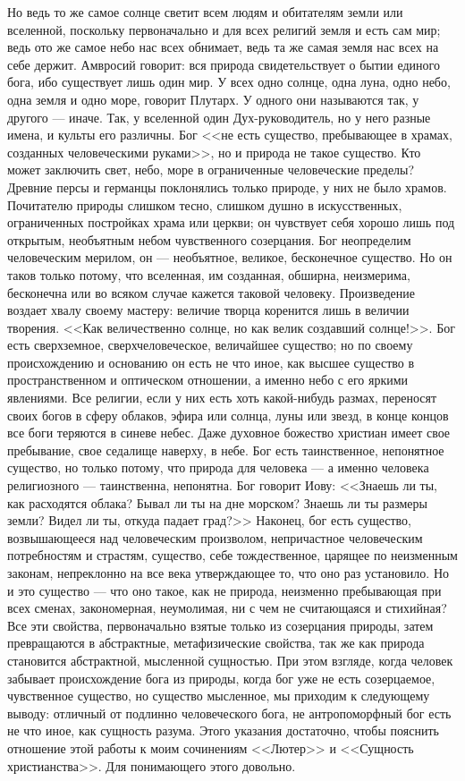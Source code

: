 \documentclass[12pt]{article}
\begin{document}
Но ведь то же самое солнце светит всем людям и обитателям земли или вселенной, поскольку первоначально и для всех религий земля и есть сам мир; ведь ото же самое небо нас всех обнимает, ведь та же самая земля нас всех на себе держит. Амвросий говорит: вся природа свидетельствует о бытии единого бога, ибо существует лишь один мир. У всех одно солнце, одна луна, одно небо, одна земля и одно море, говорит Плутарх. У одного они называются так, у другого --- иначе. Так, у вселенной один Дух-руководитель, но у него разные имена, и культы его различны. Бог <<не есть существо, пребывающее в храмах, созданных человеческими руками>>, но и природа не такое существо. Кто может заключить свет, небо, море в ограниченные человеческие пределы? Древние персы и германцы поклонялись только природе, у них не было храмов. Почитателю природы слишком тесно, слишком душно в искусственных, ограниченных постройках храма или церкви; он чувствует себя хорошо лишь под открытым, необъятным небом чувственного созерцания. Бог неопределим человеческим мерилом, он --- необъятное, великое, бесконечное существо. Но он таков только потому, что вселенная, им созданная, обширна, неизмерима, бесконечна или во всяком случае кажется таковой человеку. Произведение воздает хвалу своему мастеру: величие творца коренится лишь в величии творения. <<Как величественно солнце, но как велик создавший солнце!>>. Бог есть сверхземное, сверхчеловеческое, величайшее существо; но по своему происхождению и основанию он есть не что иное, как высшее существо в пространственном и оптическом отношении, а именно небо с его яркими явлениями. Все религии, если у них есть хоть какой-нибудь размах, переносят своих богов в сферу облаков, эфира или солнца, луны или звезд, в конце концов все боги теряются в синеве небес. Даже духовное божество христиан имеет свое пребывание, свое седалище наверху, в небе. Бог есть таинственное, непонятное существо, но только потому, что природа для человека --- а именно человека религиозного --- таинственна, непонятна. Бог говорит Иову: <<Знаешь ли ты, как расходятся облака? Бывал ли ты на дне морском? Знаешь ли ты размеры земли? Видел ли ты, откуда падает град?>> Наконец, бог есть существо, возвышающееся над человеческим произволом, непричастное человеческим потребностям и страстям, существо, себе тождественное, царящее по неизменным законам, непреклонно на все века утверждающее то, что оно раз установило. Но и это существо --- что оно такое, как не природа, неизменно пребывающая при всех сменах, закономерная, неумолимая, ни с чем не считающаяся и стихийная? Все эти свойства, первоначально взятые только из созерцания природы, затем превращаются в абстрактные, метафизические свойства, так же как природа становится абстрактной, мысленной сущностью. При этом взгляде, когда человек забывает происхождение бога из природы, когда бог уже не есть созерцаемое, чувственное существо, но существо мысленное, мы приходим к следующему выводу: отличный от подлинно человеческого бога, не антропоморфный бог есть не что иное, как сущность разума. Этого указания достаточно, чтобы пояснить отношение этой работы к моим сочинениям <<Лютер>> и <<Сущность христианства>>. Для понимающего этого довольно.
\end{document}
